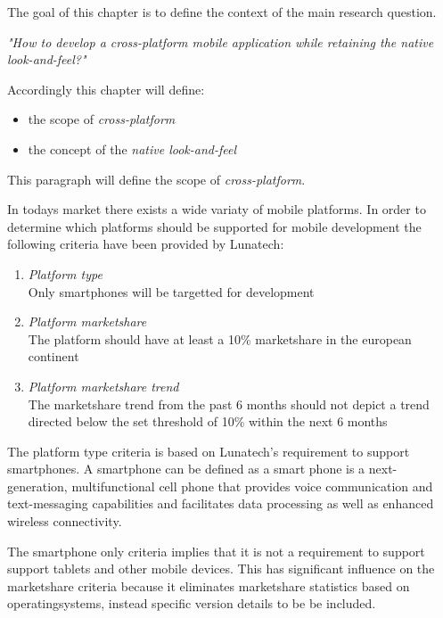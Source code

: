 
The goal of this chapter is to define the context of the main research question.

\indent \emph{"How to develop a cross-platform mobile application while retaining the native look-and-feel?"}

\noindent Accordingly this chapter will define:
\begin{itemize}
\item the scope of \emph{cross-platform}
\item the concept of the \emph{native look-and-feel}
\end{itemize}



This paragraph will define the scope of \emph{cross-platform}.


In todays market there exists a wide variaty of mobile platforms. In order to determine which platforms should be supported for mobile development the following criteria have been provided by Lunatech:

\begin{enumerate}
\item \emph{Platform type}\\
Only smartphones will be targetted for development
\item \emph{Platform marketshare}\\
The platform should have at least a 10\% marketshare in the european continent
\item \emph{Platform marketshare trend}\\
The marketshare trend from the past 6 months should not depict a trend directed below the set threshold of 10\% within the next 6 months
\end{enumerate}

The platform type criteria is based on Lunatech's requirement to support smartphones. A smartphone can be defined as a smart phone is a next-generation, multifunctional cell phone that provides voice communication and text-messaging capabilities and facilitates data processing as well as enhanced wireless connectivity.\cite{Ni2006}

The smartphone only criteria implies that it is not a requirement to support support tablets and other mobile devices. This has significant influence on the marketshare criteria because it eliminates marketshare statistics based on operatingsystems, instead specific version details to be be included. %

